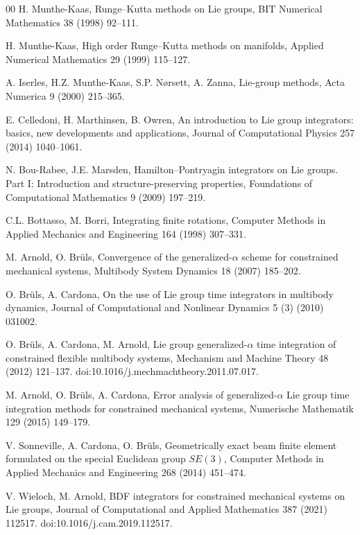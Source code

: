\documentclass[preprint,12pt]{elsarticle}
\begin{document}
\begin{thebibliography}{00}
H. Munthe-Kaas,
Runge--Kutta methods on Lie groups,
BIT Numerical Mathematics 38 (1998) 92--111.

H. Munthe-Kaas,
High order Runge--Kutta methods on manifolds,
Applied Numerical Mathematics 29 (1999) 115--127.

A. Iserles, H.Z. Munthe-Kaas, S.P. N{\o}rsett, A. Zanna,
Lie-group methods,
Acta Numerica 9 (2000) 215--365.

E. Celledoni, H. Marthinsen, B. Owren,
An introduction to Lie group integrators: basics, new developments and applications,
Journal of Computational Physics 257 (2014) 1040--1061.

N. Bou-Rabee, J.E. Marsden,
Hamilton--Pontryagin integrators on Lie groups. Part I: Introduction and structure-preserving
properties,
Foundations of Computational Mathematics 9 (2009) 197--219.

C.L. Bottasso, M. Borri,
Integrating finite rotations,
Computer Methods in Applied Mechanics and Engineering 164 (1998) 307--331.

M. Arnold, O. Br\"uls,
Convergence of the generalized-$\alpha$ scheme for constrained mechanical systems,
Multibody System Dynamics 18 (2007) 185--202.

O. Br\"uls, A. Cardona,
On the use of Lie group time integrators in multibody dynamics,
Journal of Computational and Nonlinear Dynamics 5 (3) (2010) 031002.

O. Br\"uls, A. Cardona, M. Arnold,
Lie group generalized-$\alpha$ time integration of constrained flexible multibody systems,
Mechanism and Machine Theory 48 (2012) 121--137.
doi:10.1016/j.mechmachtheory.2011.07.017.

M. Arnold, O. Br\"uls, A. Cardona,
Error analysis of generalized-$\alpha$ Lie group time integration methods for constrained
mechanical systems,
Numerische Mathematik 129 (2015) 149--179.

V. Sonneville, A. Cardona, O. Br\"uls,
Geometrically exact beam finite element formulated on the special Euclidean group $SE(3)$,
Computer Methods in Applied Mechanics and Engineering 268 (2014) 451--474.

V. Wieloch, M. Arnold,
BDF integrators for constrained mechanical systems on Lie groups,
Journal of Computational and Applied Mathematics 387 (2021) 112517.
doi:10.1016/j.cam.2019.112517.


\end{thebibliography}
\end{document}
